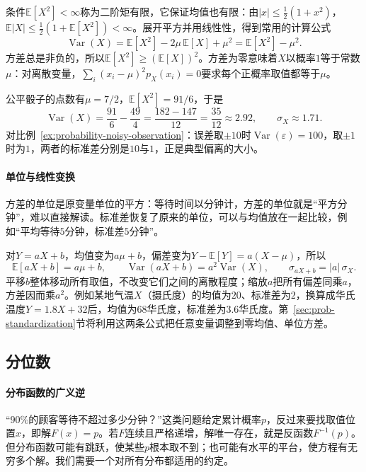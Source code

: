 条件$\mathbb{E}[X^2]<\infty$称为二阶矩有限，它保证均值也有限：由$|x|\leq\frac12(1+x^2)$，$\mathbb{E}|X|\leq\frac12(1+\mathbb{E}[X^2])<\infty$。展开平方并用线性性，得到常用的计算公式
\[
  \operatorname{Var}(X)=\mathbb{E}[X^2]-2\mu\,\mathbb{E}[X]+\mu^2=\mathbb{E}[X^2]-\mu^2 .
\]
方差总是非负的，所以$\mathbb{E}[X^2]\geq(\mathbb{E}[X])^2$。方差为零意味着$X$以概率$1$等于常数$\mu$：对离散变量，$\sum_i(x_i-\mu)^2p_X(x_i)=0$要求每个正概率取值都等于$\mu$。

\begin{example}[骰子点数的方差]
\label{ex:prob-die-variance}
公平骰子的点数有$\mu=7/2$，$\mathbb{E}[X^2]=91/6$，于是
\[
  \operatorname{Var}(X)=\frac{91}{6}-\frac{49}{4}=\frac{182-147}{12}=\frac{35}{12}\approx2.92,
  \qquad \sigma_X\approx1.71 .
\]
对比例~\ref{ex:probability-noisy-observation}：误差取$\pm10$时$\operatorname{Var}(\varepsilon)=100$，取$\pm1$时为$1$，两者的标准差分别是$10$与$1$，正是典型偏离的大小。
\end{example}

\paragraph{单位与线性变换}
方差的单位是原变量单位的平方：等待时间以分钟计，方差的单位就是“平方分钟”，难以直接解读。标准差恢复了原来的单位，可以与均值放在一起比较，例如“平均等待$5$分钟，标准差$5$分钟”。

对$Y=aX+b$，均值变为$a\mu+b$，偏差变为$Y-\mathbb{E}[Y]=a(X-\mu)$，所以
\[
  \mathbb{E}[aX+b]=a\mu+b,\qquad \operatorname{Var}(aX+b)=a^2\operatorname{Var}(X),\qquad \sigma_{aX+b}=|a|\,\sigma_X .
\]
平移$b$整体移动所有取值，不改变它们之间的离散程度；缩放$a$把所有偏差同乘$a$，方差因而乘$a^2$。例如某地气温$X$（摄氏度）的均值为$20$、标准差为$2$，换算成华氏温度$Y=1.8X+32$后，均值为$68$华氏度，标准差为$3.6$华氏度。第~\ref{sec:prob-standardization}节将利用这两条公式把任意变量调整到零均值、单位方差。

\subsection{分位数}
\label{sec:prob-quantiles}

\paragraph{分布函数的广义逆}
“$90\%$的顾客等待不超过多少分钟？”这类问题给定累计概率$p$，反过来要找取值位置$x$，即解$F(x)=p$。若$F$连续且严格递增，解唯一存在，就是反函数$F^{-1}(p)$。但分布函数可能有跳跃，使某些$p$根本取不到；也可能有水平的平台，使方程有无穷多个解。我们需要一个对所有分布都适用的约定。

